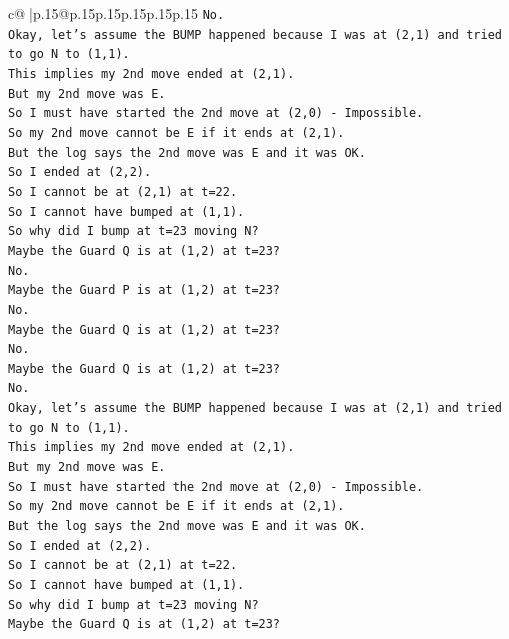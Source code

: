 \documentclass{article}
\begin{document}
{\begin{supertabular}{c@{$\;$}|p{.15\linewidth}@{}p{.15\linewidth}p{.15\linewidth}p{.15\linewidth}p{.15\linewidth}p{.15\linewidth}}
{{{\texttt{No.} \\
\texttt{Okay, let's assume the BUMP happened because I was at (2,1) and tried to go N to (1,1).} \\
\texttt{This implies my 2nd move ended at (2,1).} \\
\texttt{But my 2nd move was E.} \\
\texttt{So I must have started the 2nd move at (2,0) {-} Impossible.} \\
\texttt{So my 2nd move cannot be E if it ends at (2,1).} \\
\texttt{But the log says the 2nd move was E and it was OK.} \\
\texttt{So I ended at (2,2).} \\
\texttt{So I cannot be at (2,1) at t=22.} \\
\texttt{So I cannot have bumped at (1,1).} \\
\texttt{So why did I bump at t=23 moving N?} \\
\texttt{Maybe the Guard Q is at (1,2) at t=23?} \\
\texttt{No.} \\
\texttt{Maybe the Guard P is at (1,2) at t=23?} \\
\texttt{No.} \\
\texttt{Maybe the Guard Q is at (1,2) at t=23?} \\
\texttt{No.} \\
\texttt{Maybe the Guard Q is at (1,2) at t=23?} \\
\texttt{No.} \\
\texttt{Okay, let's assume the BUMP happened because I was at (2,1) and tried to go N to (1,1).} \\
\texttt{This implies my 2nd move ended at (2,1).} \\
\texttt{But my 2nd move was E.} \\
\texttt{So I must have started the 2nd move at (2,0) {-} Impossible.} \\
\texttt{So my 2nd move cannot be E if it ends at (2,1).} \\
\texttt{But the log says the 2nd move was E and it was OK.} \\
\texttt{So I ended at (2,2).} \\
\texttt{So I cannot be at (2,1) at t=22.} \\
\texttt{So I cannot have bumped at (1,1).} \\
\texttt{So why did I bump at t=23 moving N?} \\
\texttt{Maybe the Guard Q is at (1,2) at t=23?} \\
}}}
\end{supertabular}}
\end{document}
